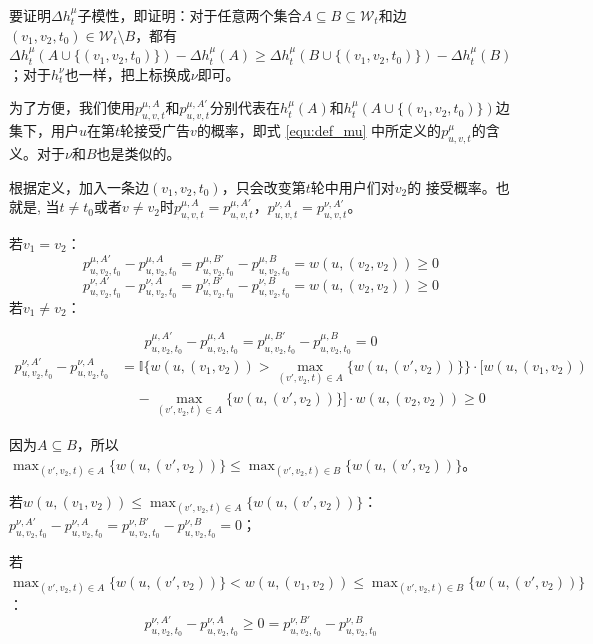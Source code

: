 要证明$\Delta h_t^\mu$子模性，即证明：对于任意两个集合$A\subseteq B \subseteq \mathcal{W}_t$和边$(v_1,v_2,t_0) \in \mathcal{W}_t \setminus B$，都有$\Delta h_t^\mu(A \cup \{(v_1,v_2,t_0)\})-\Delta h_t^\mu(A) \ge \Delta h_t^\mu(B\cup \{(v_1,v_2,t_0)\})- \Delta h_t^\mu(B)$；对于$h_t^\nu$也一样，把上标换成$\nu$即可。

为了方便，我们使用$p_{u,v,t}^{\mu,A}$和$p_{u,v,t}^{\mu,A'}$分别代表在$h_t^\mu(A)$和$h_t^\mu(A\cup\{(v_1,v_2,t_0)\})$边集下，用户$u$在第$t$轮接受广告$v$的概率，即式 \ref{equ:def_mu} 中所定义的$p_{u,v,t}^\mu$的含义。对于$\nu$和$B$也是类似的。

根据定义，加入一条边$(v_1,v_2,t_0)$，只会改变第$t$轮中用户们对$v_2$的 接受概率。也就是, 当$t\ne t_0$或者$v \ne v_2$时$p_{u,v,t}^{\mu,A}=p_{u,v,t}^{\mu,A'}$，$p_{u,v,t}^{\nu,A}=p_{u,v,t}^{\nu,A'}$。

若$v_1=v_2$：
\begin{equation}
p_{u,v_2,t_0}^{\mu,A'}-p_{u,v_2,t_0}^{\mu,A}=p_{u,v_2,t_0}^{\mu,B'}-p_{u,v_2,t_0}^{\mu,B} =w(u,(v_2,v_2)) \ge 0
\end{equation}
\begin{equation}
p_{u,v_2,t_0}^{\nu,A'}-p_{u,v_2,t_0}^{\nu,A}=p_{u,v_2,t_0}^{\nu,B'}-p_{u,v_2,t_0}^{\nu,B} =w(u,(v_2,v_2)) \ge 0
\end{equation}
若$v_1 \ne v_2$：

\begin{equation}
    p_{u,v_2,t_0}^{\mu,A'}-p_{u,v_2,t_0}^{\mu,A}=p_{u,v_2,t_0}^{\mu,B'}-p_{u,v_2,t_0}^{\mu,B} = 0 
\end{equation}
\begin{align}
    p_{u,v_2,t_0}^{\nu,A'}-p_{u,v_2,t_0}^{\nu,A}&=\mathbb{I}\{w(u,(v_1,v_2))>\max_{(v',v_2,t)\in A}\{w(u,(v',v_2))\}\} \cdot [w(u,(v_1,v_2)) \nonumber \\ 
    & \ \ \ \ \ -\max_{(v',v_2,t)\in A}\{w(u,(v',v_2))\}] \cdot w(u,(v_2,v_2)) \ge  0
\end{align}

因为$A \subseteq B$，所以$\max_{(v',v_2,t)\in A}\{w(u,(v',v_2))\} \le \max_{(v',v_2,t)\in B}\{w(u,(v',v_2))\}$。

若$w(u,(v_1,v_2))\le \max_{(v',v_2,t)\in A}\{w(u,(v',v_2))\}$：$p_{u,v_2,t_0}^{\nu,A'}-p_{u,v_2,t_0}^{\nu,A}=p_{u,v_2,t_0}^{\nu,B'}-p_{u,v_2,t_0}^{\nu,B}=0$；

若$\max_{(v',v_2,t)\in A}\{w(u,(v',v_2))\} < w(u,(v_1,v_2)) \le \max_{(v',v_2,t)\in B}\{w(u,(v',v_2))\}$：
\begin{equation}
p_{u,v_2,t_0}^{\nu,A'}-p_{u,v_2,t_0}^{\nu,A}\ge 0 = p_{u,v_2,t_0}^{\nu,B'}-p_{u,v_2,t_0}^{\nu,B}
\end{equation}

